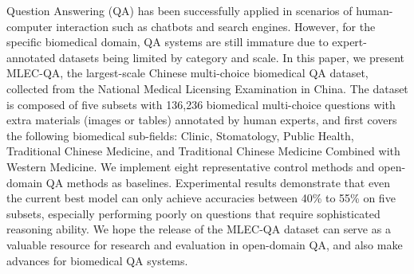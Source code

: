 Question Answering (QA) has been successfully applied in scenarios of human-computer interaction such as chatbots and search engines. However, for the specific biomedical domain, QA systems are still immature due to expert-annotated datasets being limited by category and scale. In this paper, we present MLEC-QA, the largest-scale Chinese multi-choice biomedical QA dataset, collected from the National Medical Licensing Examination in China. The dataset is composed of five subsets with 136,236 biomedical multi-choice questions with extra materials (images or tables) annotated by human experts, and first covers the following biomedical sub-fields: Clinic, Stomatology, Public Health, Traditional Chinese Medicine, and Traditional Chinese Medicine Combined with Western Medicine. We implement eight representative control methods and open-domain QA methods as baselines. Experimental results demonstrate that even the current best model can only achieve accuracies between 40\% to 55\% on five subsets, especially performing poorly on questions that require sophisticated reasoning ability. We hope the release of the MLEC-QA dataset can serve as a valuable resource for research and evaluation in open-domain QA, and also make advances for biomedical QA systems.
